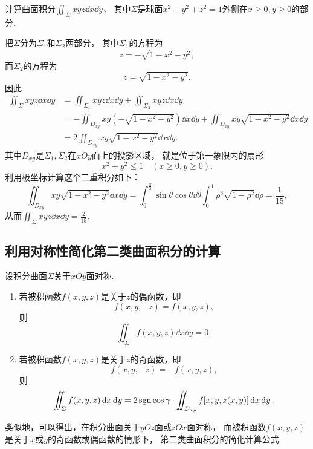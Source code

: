 \begin{example}
计算曲面积分\(\iint_\Sigma xyz \dd{x}\dd{y}\)，
其中\(\Sigma\)是球面\(x^2+y^2+z^2=1\)外侧在\(x\geq0,y\geq0\)的部分.
\begin{solution}
把\(\Sigma\)分为\(\Sigma_1\)和\(\Sigma_2\)两部分，
其中\(\Sigma_1\)的方程为\[
	z = -\sqrt{1-x^2-y^2},
\]
而\(\Sigma_2\)的方程为\[
	z = \sqrt{1-x^2-y^2}.
\]
因此\begin{align*}
	\iint_\Sigma xyz \dd{x}\dd{y}
	&= \iint_{\Sigma_1} xyz \dd{x}\dd{y}
	+ \iint_{\Sigma_2} xyz \dd{x}\dd{y} \\
	&= -\iint_{D_{xy}} xy (-\sqrt{1-x^2-y^2}) \dd{x}\dd{y}
	+ \iint_{D_{xy}} xy \sqrt{1-x^2-y^2} \dd{x}\dd{y} \\
	&= 2 \iint_{D_{xy}} xy \sqrt{1-x^2-y^2} \dd{x}\dd{y}.
\end{align*}
其中\(D_{xy}\)是\(\Sigma_1,\Sigma_2\)在\(xOy\)面上的投影区域，
就是位于第一象限内的扇形\[
	x^2+y^2\leq1 \quad(x\geq0,y\geq0).
\]
利用极坐标计算这个二重积分如下：\[
	\iint_{D_{xy}} xy \sqrt{1-x^2-y^2} \dd{x}\dd{y}
	= \int_0^{\frac\pi2} \sin\theta \cos\theta \dd{\theta}
		\int_0^1 \rho^3 \sqrt{1-\rho^2} \dd{\rho}
	= \frac{1}{15},
\]
从而\(\iint_\Sigma xyz \dd{x}\dd{y} = \frac{2}{15}\).
\end{solution}
\end{example}

\subsection{利用对称性简化第二类曲面积分的计算}
设积分曲面\(\Sigma\)关于\(xOy\)面对称.
\begin{enumerate}
	\item 若被积函数\(f(x,y,z)\)是关于\(z\)的偶函数，即\[
		f(x,y,-z) = f(x,y,z),
	\]
	则\[
		\iint_\Sigma f(x,y,z) \dd{x}\dd{y} = 0;
	\]

	\item 若被积函数\(f(x,y,z)\)是关于\(z\)的奇函数，即\[
		f(x,y,-z) = -f(x,y,z),
	\]
	则\[
		\iint_\Sigma f(x,y,z) \dd{x}\dd{y}
		= 2 \operatorname{sgn}\cos\gamma \cdot \iint_{D_{xy}} f[x,y,z(x,y)] \dd{x}\dd{y}.
	\]
\end{enumerate}

类似地，可以得出，在积分曲面关于\(yOz\)面或\(zOx\)面对称，
而被积函数\(f(x,y,z)\)是关于\(x\)或\(y\)的奇函数或偶函数的情形下，
第二类曲面积分的简化计算公式.
